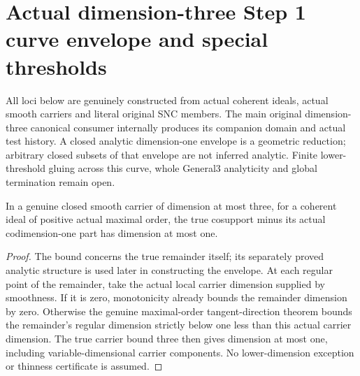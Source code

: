 \section{Actual dimension-three Step 1 curve envelope and special thresholds}

All loci below are genuinely constructed from actual coherent ideals, actual smooth
carriers and literal original SNC members. The main original dimension-three
canonical consumer internally produces its companion domain and actual test
history. A closed analytic dimension-one envelope is a geometric reduction;
arbitrary closed subsets of that envelope are not inferred analytic. Finite
lower-threshold gluing across this curve, whole General3 analyticity and global
termination remain open.

\begin{lemma}
\label{hir:dimension-three-maximal-remainder-dimone}
\leanok
In a genuine closed smooth carrier of dimension at most three, for a coherent
ideal of positive actual maximal order, the true cosupport minus its actual
codimension-one part has dimension at most one.
\end{lemma}
\begin{proof}
The bound concerns the true remainder itself; its separately proved analytic
structure is used later in constructing the envelope. At each regular point
of the remainder, take the actual local carrier dimension supplied by smoothness. If it is zero, monotonicity already bounds the remainder dimension
by zero. Otherwise the genuine maximal-order tangent-direction theorem bounds
the remainder's regular dimension strictly below one less than this actual
carrier dimension. The true carrier bound three then gives dimension at most
one, including variable-dimensional carrier components. No lower-dimension
exception or thinness certificate is assumed.
\end{proof}

